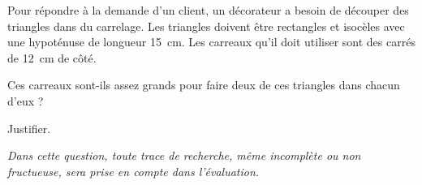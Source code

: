 
\medskip

Pour répondre à la demande d'un client, un décorateur a besoin de découper des triangles dans du carrelage. Les triangles doivent être rectangles et isocèles avec une hypoténuse de longueur 15~cm. Les carreaux qu'il doit utiliser sont des carrés de 12~cm de côté.

Ces carreaux sont-ils assez grands pour faire deux de ces triangles dans chacun d'eux ? 

Justifier.

\emph{Dans cette question, toute trace de recherche, même incomplète ou non fructueuse, sera prise en compte dans l'évaluation.}

\vspace{0,5cm}

